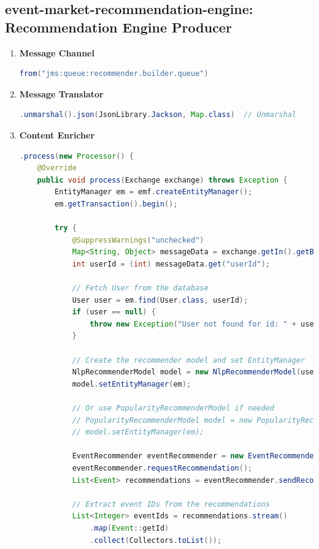 \documentclass{article}
\begin{document}
\subsection{event-market-recommendation-engine: Recommendation Engine Producer}
\begin{enumerate}
    \item \textbf{Message Channel}
\begin{lstlisting}[language=Java, caption={Message Channel for Recommendation Engine}]
from("jms:queue:recommender.builder.queue")
\end{lstlisting}
    \item \textbf{Message Translator}
\begin{lstlisting}[language=Java, caption={Message Translator for Recommendation Engine}]
.unmarshal().json(JsonLibrary.Jackson, Map.class)  // Unmarshal 
\end{lstlisting}
    \item \textbf{Content Enricher}
\begin{lstlisting}[language=Java, caption={Content Enricher for Recommendation Engine}]
.process(new Processor() {
    @Override
    public void process(Exchange exchange) throws Exception {
        EntityManager em = emf.createEntityManager();
        em.getTransaction().begin();

        try {
            @SuppressWarnings("unchecked")
            Map<String, Object> messageData = exchange.getIn().getBody(Map.class);
            int userId = (int) messageData.get("userId");

            // Fetch User from the database
            User user = em.find(User.class, userId);
            if (user == null) {
                throw new Exception("User not found for id: " + userId);
            }

            // Create the recommender model and set EntityManager
            NlpRecommenderModel model = new NlpRecommenderModel(user);
            model.setEntityManager(em);
            
            // Or use PopularityRecommenderModel if needed
            // PopularityRecommenderModel model = new PopularityRecommenderModel(user);
            // model.setEntityManager(em);

            EventRecommender eventRecommender = new EventRecommender(model);
            eventRecommender.requestRecommendation();
            List<Event> recommendations = eventRecommender.sendRecommendation();

            // Extract event IDs from the recommendations
            List<Integer> eventIds = recommendations.stream()
                .map(Event::getId)
                .collect(Collectors.toList());


\end{lstlisting}
\end{enumerate}
\end{document}

